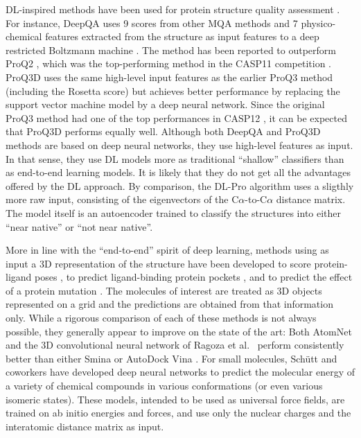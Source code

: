 \documentclass{bioinfo}
\begin{document}
DL-inspired methods have been used for protein structure quality
assessment \citep{nguyen2014dlpro, cao2016deepqa,
uziela2017proq3d}. For instance, DeepQA \citep{cao2016deepqa} uses 9
scores from other MQA methods and 7 physico-chemical features
extracted from the structure as input features to a deep restricted
Boltzmann machine \citep{hinton2006fast}. The method has been
reported \citep{cao2016deepqa} to outperform ProQ2 \citep{ray2012proq2},
which was the top-performing method in the CASP11
competition \citep{kryshtafovych2015}.  ProQ3D \citep{uziela2017proq3d}
uses the same high-level input features as the earlier ProQ3
method \citep{uziela2016proq3} (including the
Rosetta \citep{leaverfay2011rosetta} score) but achieves better
performance by replacing the support vector machine model by a deep
neural network. Since the original ProQ3 method had one of the top
performances in CASP12 \citep{elofsson2017qacasp12}, it can be expected
that ProQ3D performs equally well. Although both DeepQA and ProQ3D
methods are based on deep neural networks, they use high-level
features as input. In that sense, they use DL models more as
traditional ``shallow'' classifiers than as end-to-end learning
models. It is likely that they do not get all the advantages offered
by the DL approach.
By comparison, the DL-Pro algorithm \citep{nguyen2014dlpro} uses a
sligthly more raw input, consisting of the eigenvectors of the
C$\alpha$-to-C$\alpha$ distance matrix. The model itself is an
autoencoder \citep{hinton2006reducing} trained to classify the
structures into either ``near native'' or ``not near native''.

More in line with the ``end-to-end'' spirit of deep learning, methods
using as input a 3D representation of the structure have been
developed to score protein-ligand poses \citep{wallach2015atomnet,
ragoza2017protein}, to predict ligand-binding protein
pockets \citep{jimenez2017deepsite}, and to predict the effect of a
protein mutation \citep{torng2017}. The molecules of interest are
treated as 3D objects represented on a grid and the predictions are
obtained from that information only. While a rigorous comparison of
each of these methods is not always possible, they generally appear to
improve on the state of the art: Both
AtomNet \citep{wallach2015atomnet} and the 3D convolutional neural
network of Ragoza et al.\ \citep{ragoza2017protein} perform
consistently better than either Smina \citep{koes2013smina} or AutoDock
Vina \citep{trott2009vina}.
For small molecules, Sch\"{u}tt and coworkers \cite{schutt2017quantum,
schutt2017moleculenet} have developed deep neural networks to predict
the molecular energy of a variety of chemical compounds in various
conformations (or even various isomeric states). These models,
intended to be used as universal force fields, are trained on ab
initio energies and forces, and use only the nuclear charges and the
interatomic distance matrix as input.
\end{document}
